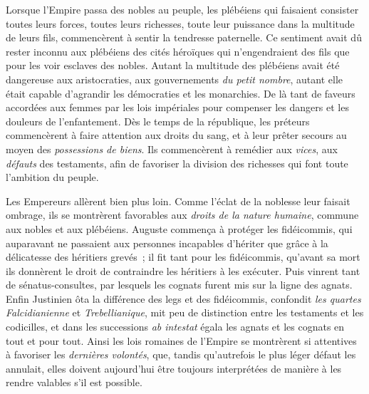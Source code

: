 \documentclass[french,twoside]{book} %
\begin{document}
Lorsque l’Empire passa des nobles au peuple, les plébéiens qui faisaient consister toutes leurs forces, toutes leurs richesses, toute leur puissance dans la multitude de leurs fils, commencèrent à sentir la tendresse paternelle. Ce sentiment avait dû rester inconnu aux plébéiens des cités héroïques qui n’engendraient des fils que pour les voir esclaves des nobles. Autant la multitude des plébéiens avait été dangereuse aux aristocraties, aux gouvernements {\itshape du petit nombre}, autant elle était capable d’agrandir les démocraties et les monarchies. De là tant de faveurs accordées aux femmes par les lois impériales pour compenser les dangers et les douleurs de l’enfantement. Dès le temps de la république, les préteurs commencèrent à faire attention aux droits du sang, et à leur prêter secours au moyen des {\itshape possessions de biens}. Ils commencèrent à remédier aux {\itshape vices}, aux {\itshape défauts} des testaments, afin de favoriser la division des richesses qui font toute l’ambition du peuple.\par
 Les Empereurs allèrent bien plus loin. Comme l’éclat de la noblesse leur faisait ombrage, ils se montrèrent favorables aux {\itshape droits de la nature humaine}, commune aux nobles et aux plébéiens. Auguste commença à protéger les fidéicommis, qui auparavant ne passaient aux personnes incapables d’hériter que grâce à la délicatesse des héritiers grevés ; il fit tant pour les fidéicommis, qu’avant sa mort ils donnèrent le droit de contraindre les héritiers à les exécuter. Puis vinrent tant de sénatus-consultes, par lesquels les cognats furent mis sur la ligne des agnats. Enfin Justinien ôta la différence des legs et des fidéicommis, confondit {\itshape les quartes Falcidianienne} et {\itshape Trebellianique}, mit peu de distinction entre les testaments et les codicilles, et dans les successions {\itshape ab intestat} égala les agnats et les cognats en tout et pour tout. Ainsi les lois romaines de l’Empire se montrèrent si attentives à favoriser les {\itshape dernières volontés}, que, tandis qu’autrefois le plus léger défaut les annulait, elles doivent aujourd’hui être toujours interprétées de manière à les rendre valables s’il est possible.\par
\end{document}
